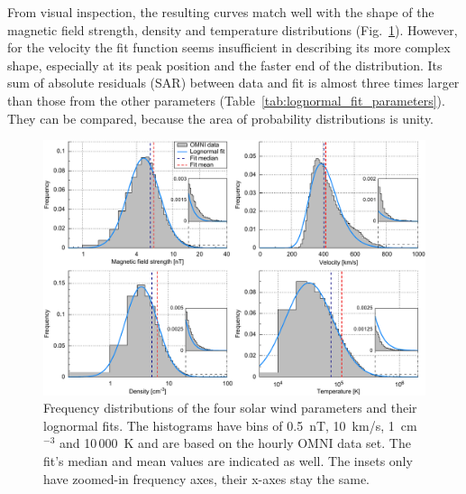
From visual inspection, the resulting curves match well with the shape of the magnetic field strength, density and temperature distributions (Fig.~\ref{fig:histogram_fits_4_a_zoom_paper_pdfplot}). However, for the velocity the fit function seems insufficient in describing its more complex shape, especially at its peak position and the faster end of the distribution. Its sum of absolute residuals (SAR) between data and fit is almost three times larger than those from the other parameters (Table~\ref{tab:lognormal_fit_parameters}). They can be compared, because the area of probability distributions is unity.
\begin{figure}
	\includegraphics[width=18cm]{figures/histogram_fits_4_a_zoom_paper_pdfplot.pdf}
	\caption{Frequency distributions of the four solar wind parameters and their lognormal fits. The histograms have bins of 0.5~nT, 10~km/s, 1~cm$^{-3}$ and 10\,000~K and are based on the hourly OMNI data set. The fit's median and mean values are indicated as well. The insets only have zoomed-in frequency axes, their x-axes stay the same.}
	\label{fig:histogram_fits_4_a_zoom_paper_pdfplot}
\end{figure}

